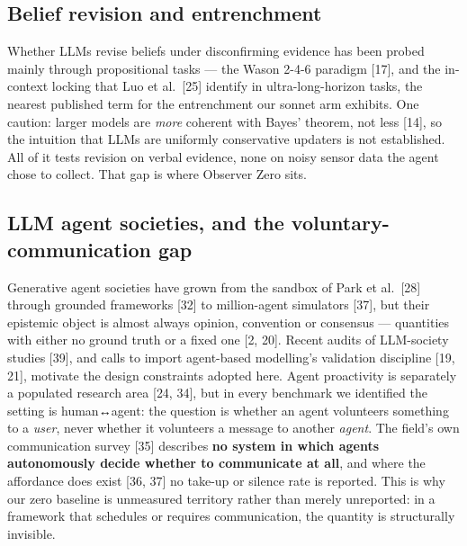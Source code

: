 \documentclass[pdflatex,sn-basic]{sn-jnl}
\begin{document}
\hypertarget{belief-revision-and-entrenchment}{%
\subsection{Belief revision and entrenchment}\label{belief-revision-and-entrenchment}}

Whether LLMs revise beliefs under disconfirming evidence has
been probed mainly through propositional tasks --- the Wason 2-4-6 paradigm {[}17{]}, and the in-context locking that Luo et al.~{[}25{]} identify in ultra-long-horizon tasks, the nearest published term for the
entrenchment our sonnet arm exhibits. One caution: larger models are \emph{more} coherent with Bayes' theorem, not less {[}14{]}, so the
intuition that LLMs are uniformly conservative updaters is not established. All of it tests revision on verbal evidence, none on noisy sensor data the agent
chose to collect. That gap is where Observer Zero sits.

\hypertarget{llm-agent-societies-and-the-voluntary-communication-gap}{%
\subsection{LLM agent societies, and the voluntary-communication gap}\label{llm-agent-societies-and-the-voluntary-communication-gap}}

Generative agent societies have
grown from the sandbox of Park et al.~{[}28{]} through grounded frameworks {[}32{]} to million-agent simulators
{[}37{]}, but their epistemic object is almost always opinion, convention or consensus --- quantities
with either no ground truth or a fixed one {[}2, 20{]}. Recent audits of LLM-society studies {[}39{]}, and calls to import agent-based modelling's
validation discipline {[}19, 21{]}, motivate the design constraints adopted here. Agent proactivity is separately a populated research area {[}24, 34{]}, but in every benchmark we identified the setting is human↔agent: the question is whether an
agent volunteers something to a \emph{user}, never whether it volunteers a message to another
\emph{agent}. The field's own communication
survey {[}35{]} describes \textbf{no system in which agents autonomously decide whether to communicate at
all}, and where the affordance does exist {[}36, 37{]} no take-up or silence rate is reported. This
is why our zero baseline is unmeasured territory rather than merely unreported: in a framework
that schedules or requires communication, the quantity is structurally invisible.
\end{document}
